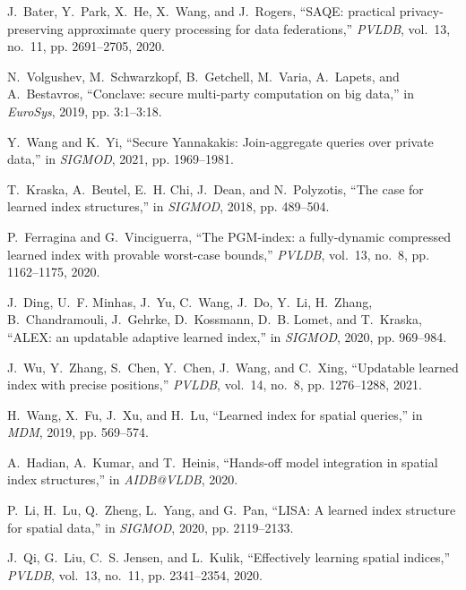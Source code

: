 \documentclass[11pt]{article}
\begin{document}
\begin{thebibliography}{10}
J.~Bater, Y.~Park, X.~He, X.~Wang, and J.~Rogers, ``{SAQE:} practical
  privacy-preserving approximate query processing for data federations,''
  \emph{{PVLDB}}, vol.~13, no.~11, pp. 2691--2705, 2020.

N.~Volgushev, M.~Schwarzkopf, B.~Getchell, M.~Varia, A.~Lapets, and
  A.~Bestavros, ``Conclave: secure multi-party computation on big data,'' in
  \emph{{EuroSys}}, 2019, pp. 3:1--3:18.

Y.~Wang and K.~Yi, ``Secure {Y}annakakis: Join-aggregate queries over private
  data,'' in \emph{{SIGMOD}}, 2021, pp. 1969--1981.

T.~Kraska, A.~Beutel, E.~H. Chi, J.~Dean, and N.~Polyzotis, ``The case for
  learned index structures,'' in \emph{{SIGMOD}}, 2018, pp. 489--504.

P.~Ferragina and G.~Vinciguerra, ``The {PGM}-index: a fully-dynamic compressed
  learned index with provable worst-case bounds,'' \emph{{PVLDB}}, vol.~13,
  no.~8, pp. 1162--1175, 2020.

J.~Ding, U.~F. Minhas, J.~Yu, C.~Wang, J.~Do, Y.~Li, H.~Zhang, B.~Chandramouli,
  J.~Gehrke, D.~Kossmann, D.~B. Lomet, and T.~Kraska, ``{ALEX:} an updatable
  adaptive learned index,'' in \emph{{SIGMOD}}, 2020, pp. 969--984.

J.~Wu, Y.~Zhang, S.~Chen, Y.~Chen, J.~Wang, and C.~Xing, ``Updatable learned
  index with precise positions,'' \emph{{PVLDB}}, vol.~14, no.~8, pp.
  1276--1288, 2021.

H.~Wang, X.~Fu, J.~Xu, and H.~Lu, ``Learned index for spatial queries,'' in
  \emph{{MDM}}, 2019, pp. 569--574.

A.~Hadian, A.~Kumar, and T.~Heinis, ``Hands-off model integration in spatial
  index structures,'' in \emph{AIDB@VLDB}, 2020.

P.~Li, H.~Lu, Q.~Zheng, L.~Yang, and G.~Pan, ``{LISA:} {A} learned index
  structure for spatial data,'' in \emph{{SIGMOD}}, 2020, pp. 2119--2133.

J.~Qi, G.~Liu, C.~S. Jensen, and L.~Kulik, ``Effectively learning spatial
  indices,'' \emph{{PVLDB}}, vol.~13, no.~11, pp. 2341--2354, 2020.


\end{thebibliography}
\end{document}

